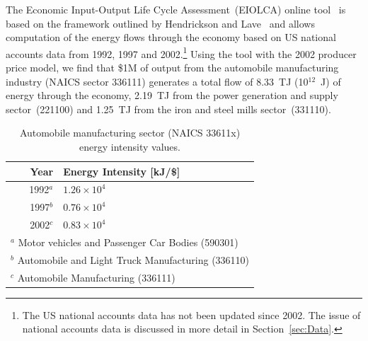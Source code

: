 The Economic Input-Output Life Cycle 
Assessment~(EIOLCA) online tool~\cite{EIOLCA2014} 
is based on the framework outlined
by Hendrickson and Lave~\cite{Hendrickson2006}
and allows computation of the energy flows through
the economy based on US national accounts data from 1992,
1997 and 2002.\footnote{The 
US national accounts
data has not been updated since 2002.
The issue of national accounts data is discussed in more
detail in Section~\ref{sec:Data}.}
Using the tool with the 2002 producer price model,
we find that \$1M of output
from the automobile manufacturing industry
(NAICS sector 336111) generates
a total flow of 8.33~TJ (10$^{12}$~J) of energy through the economy,
2.19~TJ from the power generation and 
supply sector~(221100) and 1.25~TJ from the
iron and steel mills sector~(331110).

\begin{table}
\caption{Automobile manufacturing sector (NAICS 33611x) 
		energy intensity values.\cite{EIOLCA2014}}
\begin{center}
\begin{tabular} {r @{\hspace{2em}} l}
	\toprule
	Year & Energy Intensity [kJ/\$] \\
	\midrule
	1992$^a$ & $1.26\times10^{4}$ \\
	1997$^b$ & $0.76\times10^{4}$ \\
	2002$^c$ & $0.83\times10^{4}$ \\
	\bottomrule
	\multicolumn{2}{l}{{\scriptsize $^a$ Motor vehicles and Passenger Car Bodies (590301)}}		\\
	\multicolumn{2}{l}{{\scriptsize $^b$ Automobile and Light Truck Manufacturing (336110)}}	\\
	\multicolumn{2}{l}{{\scriptsize $^c$ Automobile Manufacturing (336111)}}
\end{tabular}
\end{center}
\label{tab:EIOLCA_auto_energy_intensities}
\end{table}


